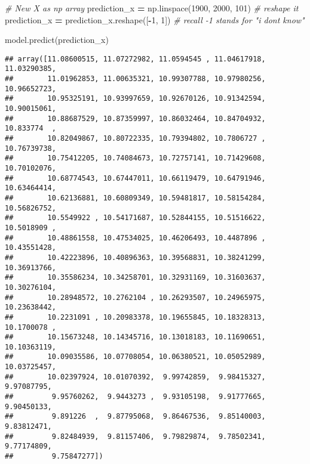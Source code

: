 \documentclass[
]{book}
\newenvironment{Shaded}{\begin{snugshade}}{\end{snugshade}}
\newcommand{\CommentTok}[1]{\textcolor[rgb]{0.56,0.35,0.01}{\textit{#1}}}
\newcommand{\DecValTok}[1]{\textcolor[rgb]{0.00,0.00,0.81}{#1}}
\newcommand{\NormalTok}[1]{#1}
\newcommand{\OperatorTok}[1]{\textcolor[rgb]{0.81,0.36,0.00}{\textbf{#1}}}
\begin{document}
\begin{Shaded}
\begin{Highlighting}[]
\CommentTok{\# New X as np array}
\NormalTok{prediction\_x }\OperatorTok{=}\NormalTok{ np.linspace(}\DecValTok{1900}\NormalTok{, }\DecValTok{2000}\NormalTok{, }\DecValTok{101}\NormalTok{)}
\CommentTok{\# reshape it}
\NormalTok{prediction\_x }\OperatorTok{=}\NormalTok{ prediction\_x.reshape([}\OperatorTok{{-}}\DecValTok{1}\NormalTok{, }\DecValTok{1}\NormalTok{]) }\CommentTok{\# recall {-}1 stands for "i don\textquotesingle{}t know"}
\end{Highlighting}
\end{Shaded}

\begin{Shaded}
\begin{Highlighting}[]
\NormalTok{model.predict(prediction\_x)}
\end{Highlighting}
\end{Shaded}

\begin{verbatim}
## array([11.08600515, 11.07272982, 11.0594545 , 11.04617918, 11.03290385,
##        11.01962853, 11.00635321, 10.99307788, 10.97980256, 10.96652723,
##        10.95325191, 10.93997659, 10.92670126, 10.91342594, 10.90015061,
##        10.88687529, 10.87359997, 10.86032464, 10.84704932, 10.833774  ,
##        10.82049867, 10.80722335, 10.79394802, 10.7806727 , 10.76739738,
##        10.75412205, 10.74084673, 10.72757141, 10.71429608, 10.70102076,
##        10.68774543, 10.67447011, 10.66119479, 10.64791946, 10.63464414,
##        10.62136881, 10.60809349, 10.59481817, 10.58154284, 10.56826752,
##        10.5549922 , 10.54171687, 10.52844155, 10.51516622, 10.5018909 ,
##        10.48861558, 10.47534025, 10.46206493, 10.4487896 , 10.43551428,
##        10.42223896, 10.40896363, 10.39568831, 10.38241299, 10.36913766,
##        10.35586234, 10.34258701, 10.32931169, 10.31603637, 10.30276104,
##        10.28948572, 10.2762104 , 10.26293507, 10.24965975, 10.23638442,
##        10.2231091 , 10.20983378, 10.19655845, 10.18328313, 10.1700078 ,
##        10.15673248, 10.14345716, 10.13018183, 10.11690651, 10.10363119,
##        10.09035586, 10.07708054, 10.06380521, 10.05052989, 10.03725457,
##        10.02397924, 10.01070392,  9.99742859,  9.98415327,  9.97087795,
##         9.95760262,  9.9443273 ,  9.93105198,  9.91777665,  9.90450133,
##         9.891226  ,  9.87795068,  9.86467536,  9.85140003,  9.83812471,
##         9.82484939,  9.81157406,  9.79829874,  9.78502341,  9.77174809,
##         9.75847277])
\end{verbatim}
\end{document}
